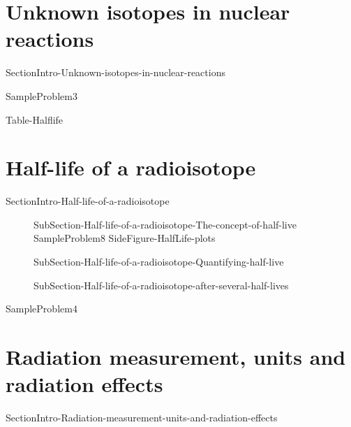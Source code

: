 \documentclass[main.tex]{subfiles}
\begin{document}
\section{Unknown isotopes in nuclear reactions}

{SectionIntro-Unknown-isotopes-in-nuclear-reactions}

  {SampleProblem3}

 


 
{Table-Halflife}


 

\section{Half-life of a radioisotope}
{SectionIntro-Half-life-of-a-radioisotope}



\sloppy \begin{description}

\item[]
{SubSection-Half-life-of-a-radioisotope-The-concept-of-half-live}
  {SampleProblem8}
  {SideFigure-HalfLife-plots}
\item[]
{SubSection-Half-life-of-a-radioisotope-Quantifying-half-live}
\item[] 
{SubSection-Half-life-of-a-radioisotope-after-several-half-lives}






\end{description}






  {SampleProblem4}





\section{Radiation measurement, units and radiation effects}
{SectionIntro-Radiation-measurement-units-and-radiation-effects}
 
\end{document}
